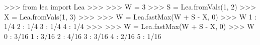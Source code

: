 
>>> from lea import Lea
>>>
>>> W = 3
>>> S = Lea.fromVals(1,  2)
>>> X = Lea.fromVals(1,  3)
>>>
>>> W = Lea.fastMax(W + S - X, 0)
>>> W
1 : 1/4
2 : 1/4
3 : 1/4
4 : 1/4
>>>
>>> W = Lea.fastMax(W + S - X, 0)
>>> W
0 : 3/16
1 : 3/16
2 : 4/16
3 : 3/16
4 : 2/16
5 : 1/16

